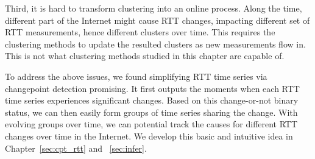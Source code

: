 Third, it is hard to transform clustering into an online process. Along the time, different part of the Internet might cause RTT changes, impacting different set of RTT measurements, hence different clusters over time. This requires the clustering methods to update the resulted clusters as new measurements flow in. This is not what clustering methods studied in this chapter are capable of.

To address the above issues, we found simplifying RTT time series via changepoint detection promising. It first outputs the moments when each RTT time series experiences significant changes. Based on this change-or-not binary status, we can then easily form groups of time series sharing the change. With evolving groups over time, we can potential track the causes for different RTT changes over time in the Internet.
We develop this basic and intuitive idea in Chapter~\ref{sec:cpt_rtt} and ~\ref{sec:infer}.
